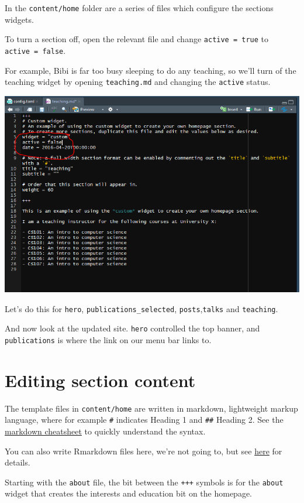 \documentclass[12pt,]{book}
\theoremstyle{definition}
\theoremstyle{definition}
\theoremstyle{definition}
\theoremstyle{remark}
\begin{document}
In the \texttt{content/home} folder are a series of files which
configure the sections widgets.

To turn a section off, open the relevant file and change
\texttt{active\ =\ true} to \texttt{active\ =\ false}.

For example, Bibi is far too busy sleeping to do any teaching, so we'll
turn of the teaching widget by opening \texttt{teaching.md} and changing
the \texttt{active} status.

\includegraphics[width=1.2\linewidth]{img/turn-off-widget}

Let's do this for \texttt{hero}, \texttt{publications\_selected},
\texttt{posts},\texttt{talks} and \texttt{teaching}.

And now look at the updated site. \texttt{hero} controlled the top
banner, and \texttt{publications} is where the link on our menu bar
links to.

\section{Editing section content}\label{editing-section-content}

The template files in \texttt{content/home} are written in markdown,
lightweight markup language, where for example \texttt{\#} indicates
Heading 1 and \texttt{\#\#} Heading 2. See the
\href{https://github.com/adam-p/markdown-here/wiki/Markdown-Cheatsheet}{markdown
cheatsheet} to quickly understand the syntax.

You can also write Rmarkdown files here, we're not going to, but see
\href{https://bookdown.org/yihui/blogdown/output-format.html}{here} for
details.

Starting with the \texttt{about} file, the bit between the \texttt{+++}
symbols is for the \texttt{about} widget that creates the interests and
education bit on the homepage.
\end{document}
